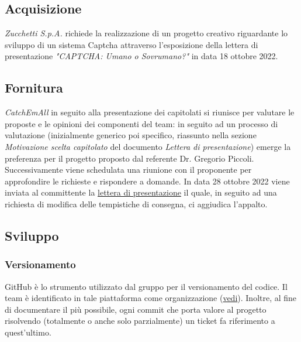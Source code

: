 \subsection{Acquisizione}
\textit{Zucchetti S.p.A.} richiede la realizzazione di un progetto creativo riguardante lo sviluppo di un sistema Captcha attraverso l'esposizione della lettera di presentazione \textit{"CAPTCHA: Umano o Sovrumano?"} in data 18 ottobre 2022.

\subsection{Fornitura}
\textit{CatchEmAll} in seguito alla presentazione dei capitolati si riunisce per valutare le proposte e le opinioni dei componenti del team: in seguito ad un processo di valutazione (inizialmente generico poi specifico, riassunto nella sezione \textit{Motivazione scelta capitolato} del documento \textit{Lettera di presentazione}) emerge la preferenza per il progetto proposto dal referente Dr. Gregorio Piccoli.  
Successivamente viene schedulata una riunione con il proponente per approfondire le richieste e rispondere a domande. 
In data 28 ottobre 2022 viene inviata al committente la \href{https://github.com/catchEmAll-SWE/catchEmAll-Docs/blob/main/Assegnazione%20appalti/LetteraCandidatura.pdf}{lettera di presentazione} il quale, in seguito ad una richiesta di modifica delle tempistiche di consegna, ci aggiudica l'appalto.

\subsection{Sviluppo}
    \subsubsection{Versionamento}
    GitHub è lo strumento utilizzato dal gruppo per il versionamento del codice.
    Il team è identificato in tale piattaforma come organizzazione (\href{https://github.com/catchEmAll-SWE}{vedi}).
    Inoltre, al fine di documentare il più possibile, ogni commit che porta valore al progetto risolvendo (totalmente o anche solo parzialmente) un ticket fa riferimento a quest'ultimo. 
    
